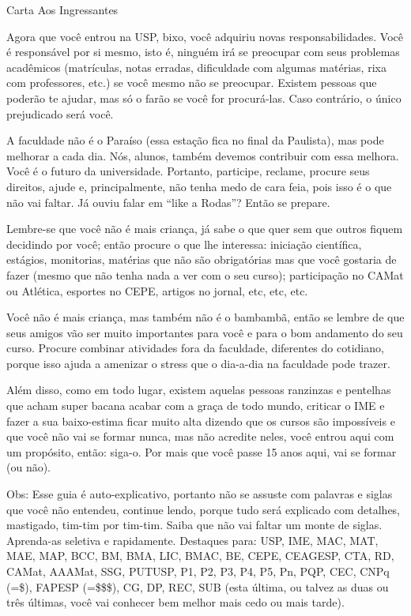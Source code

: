 \begin{secao}{Carta Aos Ingressantes}

Agora que você entrou na USP, bixo, você adquiriu novas responsabilidades.
Você é responsável por si mesmo, isto é, ninguém irá se preocupar com seus
problemas acadêmicos (matrículas, notas erradas, dificuldade com algumas
matérias, rixa com professores, etc.) se você mesmo não se preocupar. Existem
pessoas que poderão te ajudar, mas só o farão se você for procurá-las. Caso
contrário, o único prejudicado será você.

A faculdade não é o Paraíso (essa estação fica no final da Paulista), mas pode
melhorar a cada dia. Nós, alunos, também devemos contribuir com essa melhora.
Você é o futuro da universidade. Portanto, participe, reclame, procure seus
direitos, ajude e, principalmente, não tenha medo de cara feia, pois isso é o
que não vai faltar. Já ouviu falar em “like a Rodas”? Então se prepare.

Lembre-se que você não é mais criança, já sabe o que quer sem que outros fiquem
decidindo por você; então procure o que lhe interessa: iniciação científica,
estágios, monitorias, matérias que não são obrigatórias mas que você gostaria
de fazer (mesmo que não tenha nada a ver com o seu curso); participação no
CAMat ou Atlética, esportes no CEPE, artigos no jornal, etc, etc, etc.

Você não é mais criança, mas também não é o bambambã, então se lembre de que
seus amigos vão ser muito importantes para você e para o bom andamento do seu
curso. Procure combinar atividades fora da faculdade, diferentes do cotidiano,
porque isso ajuda a amenizar o stress que o dia-a-dia na faculdade pode trazer.

Além disso, como em todo lugar, existem aquelas pessoas ranzinzas e pentelhas
que acham super bacana acabar com a graça de todo mundo, criticar o IME e fazer
a sua baixo-estima ficar muito alta dizendo que os cursos são impossíveis e que
você não vai se formar nunca, mas não acredite neles, você entrou aqui com um
propósito, então: siga-o. Por mais que você passe 15 anos aqui, vai se
formar (ou não).

Obs: Esse guia é auto-explicativo, portanto não se assuste com palavras e siglas
que você não entendeu, continue lendo, porque tudo será explicado com detalhes,
mastigado, tim-tim por tim-tim. Saiba que não vai faltar um monte de siglas.
Aprenda-as seletiva e rapidamente. Destaques para: USP, IME, MAC, MAT, MAE, MAP,
BCC, BM, BMA, LIC, BMAC, BE, CEPE, CEAGESP, CTA, RD, CAMat, AAAMat, SSG, PUTUSP,
P1, P2, P3, P4, P5, Pn, PQP, CEC, CNPq (=\$), FAPESP (=\$\$\$), CG, DP, REC, SUB
(esta última, ou talvez as duas ou três últimas, você vai conhecer bem melhor
mais cedo ou mais tarde).

\end{secao}

